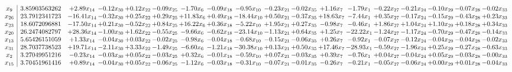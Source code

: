 \documentclass[9pt]{article}
\begin{document}
 \[\begin{array}{c| c c@{\hskip 2pt} c@{\hskip 2pt} c@{\hskip 2pt} c@{\hskip 2pt} c@{\hskip 2pt} c@{\hskip 2pt} c@{\hskip 2pt} c@{\hskip 2pt} c@{\hskip 2pt} c@{\hskip 2pt} c@{\hskip 2pt} c@{\hskip 2pt} c@{\hskip 2pt} c@{\hskip 2pt} c@{\hskip 2pt} c@{\hskip 2pt} }
 x_{9}   &  3.85903563262 & +  2.89 x_{14} & -0.12 x_{30} & +  0.12 x_{22} & -0.09 x_{25} & -1.70 x_{6} & -0.09 x_{18} & -0.95 x_{10} & -0.23 x_{21} & -0.02 x_{35} & +  1.16 x_{7} & -1.79 x_{1} & -0.22 x_{27} & -0.21 x_{24} & -0.10 x_{29} & -0.07 x_{28} & -0.02 x_{33}\\
 x_{26}   &  23.7912341723 & -16.41 x_{14} & -0.32 x_{30} & +  0.25 x_{22} & +  0.29 x_{25} & + 11.83 x_{6} & +  0.49 x_{18} & -18.44 x_{10} & +  0.50 x_{21} & -0.37 x_{35} & + 18.63 x_{7} & -7.44 x_{1} & +  0.35 x_{27} & -0.17 x_{24} & -0.15 x_{29} & -0.43 x_{28} & +  0.23 x_{33}\\
 x_{23}   &  18.6072096881 & -17.50 x_{14} & +  0.21 x_{30} & -0.52 x_{22} & +  0.84 x_{25} & + 16.22 x_{6} & +  0.36 x_{18} & -5.22 x_{10} & +  1.95 x_{21} & +  0.27 x_{35} & -0.98 x_{7} & -0.46 x_{1} & +  1.86 x_{27} & +  1.04 x_{24} & +  1.10 x_{29} & +  0.18 x_{28} & +  0.34 x_{33}\\
 x_{20}   &  26.2474082797 & + 28.36 x_{14} & -1.00 x_{30} & +  1.62 x_{22} & -0.55 x_{25} & -9.66 x_{6} & -0.62 x_{18} & -23.14 x_{10} & -1.13 x_{21} & +  0.64 x_{35} & +  1.25 x_{7} & -22.22 x_{1} & -1.24 x_{27} & -1.17 x_{24} & -0.70 x_{29} & -0.47 x_{28} & -0.14 x_{33}\\
 x_{13}   &  5.65426151059 & +  1.33 x_{14} & -0.04 x_{30} & +  0.03 x_{22} & -0.02 x_{25} & -0.98 x_{6} & -0.04 x_{18} & -0.68 x_{10} & -0.15 x_{21} & -0.06 x_{35} & +  0.26 x_{7} & -0.92 x_{1} & -0.07 x_{27} & -0.12 x_{24} & -0.04 x_{29} & -0.04 x_{28} & -0.02 x_{33}\\
 x_{31}   &  28.7037738523 & + 19.71 x_{14} & -2.11 x_{30} & +  3.33 x_{22} & -1.49 x_{25} & -6.60 x_{6} & -1.21 x_{18} & -30.38 x_{10} & +  0.13 x_{21} & +  0.50 x_{35} & + 17.46 x_{7} & -28.93 x_{1} & -0.59 x_{27} & -1.96 x_{24} & +  0.25 x_{29} & -0.27 x_{28} & -0.63 x_{33}\\
 x_{2}   &  3.27049951216 & -0.23 x_{14} & -0.03 x_{30} & +  0.05 x_{22} & -0.03 x_{25} & +  0.32 x_{6} & -0.01 x_{18} & -0.59 x_{10} & +  0.07 x_{21} & -0.03 x_{35} & +  0.39 x_{7} & -0.76 x_{1} & +  0.04 x_{27} & -0.04 x_{24} & +  0.05 x_{29} & -0.03 x_{28} & -0.00 x_{33}\\
 x_{15}   &  3.70451961416 & +  0.89 x_{14} & -0.04 x_{30} & +  0.05 x_{22} & -0.06 x_{25} & -1.12 x_{6} & -0.03 x_{18} & -0.31 x_{10} & -0.07 x_{21} & -0.01 x_{35} & -0.26 x_{7} & -0.21 x_{1} & -0.05 x_{27} & -0.06 x_{24} & +  0.00 x_{29} & +  0.01 x_{28} & -0.04 x_{33}\\

\end{array}\]
\end{document}
